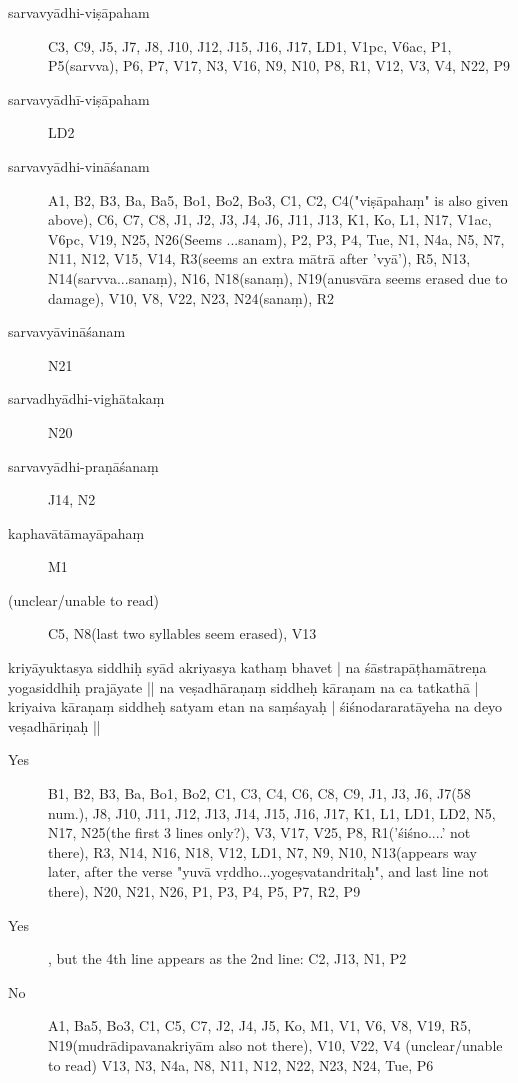 \begin{ekdosis}
         
\begin{marma}[hp01_054]
 \begin{description}
 \item[sarvavyādhi-viṣāpaham] C3, C9, J5, J7, J8, J10, J12, J15, J16, J17, LD1, V1pc, V6ac, P1,
        P5(sarvva), P6, P7, V17, N3, V16, N9, N10, P8, R1, V12, V3, V4, N22, P9
 \item[sarvavyādhī-viṣāpaham] LD2
 \item[sarvavyādhi-vināśanam] A1, B2, B3, Ba, Ba5, Bo1, Bo2, Bo3, C1, C2, C4("viṣāpahaṃ" is also given above), C6, C7, C8, J1, J2, J3, J4, J6, J11, J13, K1, Ko, L1, N17, V1ac, V6pc, V19, N25, N26(Seems ...sanam), P2, P3, P4, Tue, N1, N4a, N5, N7, N11, N12, V15, V14, R3(seems an extra mātrā after 'vyā'), R5, N13, N14(sarvva...sanaṃ), N16, N18(sanaṃ), N19(anusvāra seems erased due to damage), V10, V8, V22, N23, N24(sanaṃ), R2
\item[sarvavyāvināśanam]   N21
\item[sarvadhyādhi-vighātakaṃ]   N20
\item[sarvavyādhi-praṇāśanaṃ]        J14, N2
\item[kaphavātāmayāpahaṃ]        M1
\item[(unclear/unable to read)]        C5, N8(last two syllables seem erased), V13
        \end{description}
\end{marma}


         
\begin{marma}[hp01_055]

kriyāyuktasya siddhiḥ syād akriyasya kathaṃ bhavet |
na śāstrapāṭhamātreṇa yogasiddhiḥ prajāyate ||
na veṣadhāraṇaṃ siddheḥ kāraṇam na ca tatkathā |
kriyaiva kāraṇaṃ siddheḥ satyam etan na saṃśayaḥ |
śiśnodararatāyeha na deyo veṣadhāriṇaḥ ||

\begin{description}
\item[Yes] B1, B2, B3, Ba, Bo1, Bo2, C1, C3, C4, C6, C8, C9, J1, J3, J6, J7(58 num.), J8, J10, J11,
 J12, J13, J14, J15, J16, J17, K1, L1, LD1, LD2, N5, N17, N25(the first 3 lines only?), V3, V17, V25, P8,
 R1('śiśno....' not there), R3, N14, N16, N18, V12, LD1, N7, N9, N10, N13(appears way later, after the verse "yuvā vṛddho...yogeṣvatandritaḥ", and last line not there), N20, N21, N26, P1, P3, P4, P5, P7, R2, P9
\item[Yes], but the 4th line appears as the 2nd line: C2, J13, N1, P2
\item[No] A1, Ba5, Bo3, C1, C5, C7, J2, J4, J5, Ko, M1, V1, V6, V8, V19, R5, N19(mudrādipavanakriyām also
 not there), V10, V22, V4 (unclear/unable to read) V13, N3, N4a, N8, N11, N12, N22, N23, N24, Tue, P6
        \end{description}


\end{marma}
\end{ekdosis}
